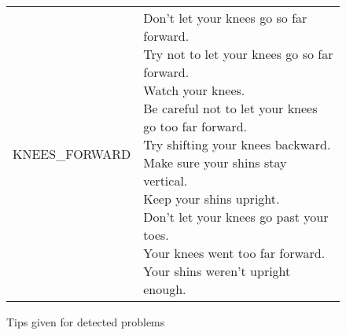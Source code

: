 \begin{figure}[H]
\begin{tabular}{ | l | p{10cm} | }
		KNEES\_FORWARD & \parbox{10cm}{
			Don't let your knees go so far forward. \\
			Try not to let your knees go so far forward. \\
			Watch your knees. \\
			Be careful not to let your knees go too far forward. \\
			Try shifting your knees backward. \\
			Make sure your shins stay vertical. \\
			Keep your shins upright. \\
			Don't let your knees go past your toes. \\
			Your knees went too far forward. \\
			Your shins weren't upright enough. \\} \\
		\hline
		
	\end{tabular}
\caption{Tips given for detected problems}
\label{fig:tips}
\end{figure}

